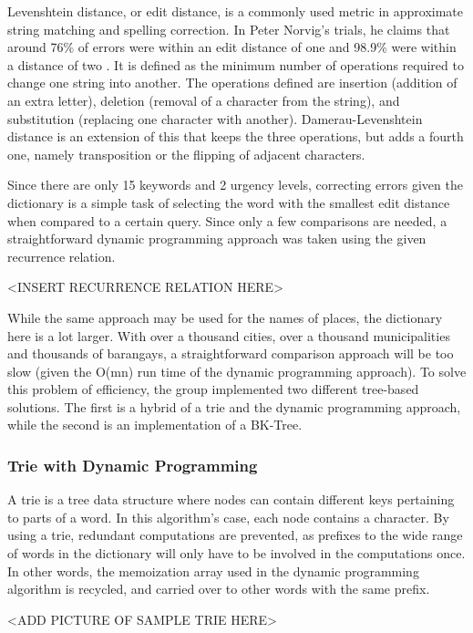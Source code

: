 \documentclass{acm_proc_article-sp}
\begin{document}
Levenshtein distance, or edit distance, is a commonly used metric in approximate string matching and spelling correction. In Peter Norvig's trials, he claims that around 76\% of errors were within an edit distance of one and 98.9\% were within a distance of two \cite{norvig:howto}. It is defined as the minimum number of operations required to change one string into another. The operations defined are insertion (addition of an extra letter), deletion (removal of a character from the string), and substitution (replacing one character with another). Damerau-Levenshtein distance is an extension of this that keeps the three operations, but adds a fourth one, namely transposition
or the flipping of adjacent characters.  

Since there are only 15 keywords and 2 urgency levels, correcting errors given the dictionary is a simple task of selecting
the word with the smallest edit distance when compared to a certain query. Since only a few comparisons are needed, a straightforward
dynamic programming approach was taken using the given recurrence relation. 

<INSERT RECURRENCE RELATION HERE> 

While the same approach may be used for the names of places, the dictionary here is a lot larger. With over a thousand cities, 
over a thousand municipalities and thousands of barangays, a straightforward comparison approach will be too slow (given the
O(mn) run time of the dynamic programming approach). To solve this problem of efficiency, the group implemented two different tree-based solutions. The first is a hybrid of a trie and the dynamic programming approach, while the second is an implementation of a BK-Tree. 

\subsubsection{Trie with Dynamic Programming}
A trie is a tree data structure where nodes can contain different keys pertaining to parts of a word. In this algorithm's case, each node contains a character. By using a trie, redundant computations are prevented, as prefixes to the wide range of words in the dictionary will only have to be involved in the computations once. In other words, the memoization array used in the dynamic programming algorithm is recycled, and carried over to other words with the same prefix.

<ADD PICTURE OF SAMPLE TRIE HERE> 
\end{document}
